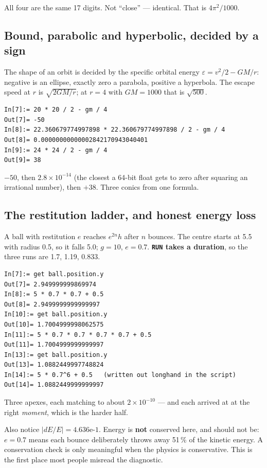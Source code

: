 \documentclass[11pt]{article}
\newcommand{\kw}[1]{\texttt{\uppercase{#1}}}
\begin{document}
All four are the same 17 digits. Not ``close'' --- identical. That is
$4\pi^2/1000$.

\subsection{Bound, parabolic and hyperbolic, decided by a sign}

The shape of an orbit is decided by the specific orbital energy
$\varepsilon = v^2/2 - GM/r$: negative is an ellipse, exactly zero a
parabola, positive a hyperbola. The escape speed at $r$ is
$\sqrt{2GM/r}$; at $r=4$ with $GM=1000$ that is $\sqrt{500}$.

\begin{lstlisting}
In[7]:= 20 * 20 / 2 - gm / 4
Out[7]= -50
In[8]:= 22.360679774997898 * 22.360679774997898 / 2 - gm / 4
Out[8]= 0.00000000000002842170943040401
In[9]:= 24 * 24 / 2 - gm / 4
Out[9]= 38
\end{lstlisting}

$-50$, then $2.8\times10^{-14}$ (the closest a 64-bit float gets to zero
after squaring an irrational number), then $+38$. Three conics from one
formula.

\subsection{The restitution ladder, and honest energy loss}

A ball with restitution $e$ reaches $e^{2n}h$ after $n$ bounces. The
centre starts at 5.5 with radius 0.5, so it falls 5.0; $g=10$, $e=0.7$.
\textbf{\kw{run} takes a duration}, so the three runs are 1.7, 1.19,
0.833.

\begin{lstlisting}
In[7]:= get ball.position.y
Out[7]= 2.949999999869974
In[8]:= 5 * 0.7 * 0.7 + 0.5
Out[8]= 2.9499999999999997
In[10]:= get ball.position.y
Out[10]= 1.7004999998062575
In[11]:= 5 * 0.7 * 0.7 * 0.7 * 0.7 + 0.5
Out[11]= 1.7004999999999997
In[13]:= get ball.position.y
Out[13]= 1.0882449997748824
In[14]:= 5 * 0.7^6 + 0.5   (written out longhand in the script)
Out[14]= 1.0882449999999997
\end{lstlisting}

Three apexes, each matching to about $2\times10^{-10}$ --- and each
arrived at at the right \emph{moment}, which is the harder half.

Also notice $|dE/E| = 4.636\text{e-}1$. Energy is \textbf{not} conserved
here, and should not be: $e=0.7$ means each bounce deliberately throws
away 51\,\% of the kinetic energy. A conservation check is only
meaningful when the physics is conservative. This is the first place
most people misread the diagnostic.
\end{document}
